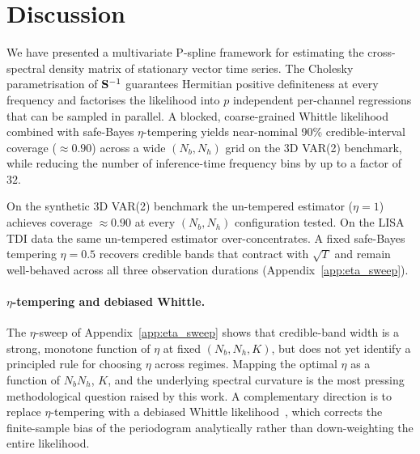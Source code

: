 \documentclass[%
	reprint,
	nofootinbib,
	amsmath,
	amssymb,
	aps,
]{revtex4-2}
\renewcommand{\S}{{\bf S}}
\begin{document}
	\section{Discussion}
	\label{sec:discussion}

	We have presented a multivariate P-spline framework for estimating the
	cross-spectral density matrix of stationary vector time series. The
	Cholesky parametrisation of $\S^{-1}$ guarantees Hermitian positive
	definiteness at every frequency and factorises the likelihood into $p$
	independent per-channel regressions that can be sampled in parallel.
	A blocked, coarse-grained Whittle likelihood combined with safe-Bayes
	$\eta$-tempering yields near-nominal 90\% credible-interval coverage
	($\approx 0.90$) across a wide $(N_{b},N_{h})$ grid on the 3D VAR(2)
	benchmark, while reducing the number of inference-time frequency bins by
	up to a factor of $32$.

	On the synthetic 3D VAR(2) benchmark the un-tempered estimator
	($\eta=1$) achieves coverage $\approx\!0.90$ at every $(N_{b},N_{h})$
	configuration tested. On the LISA TDI data the same un-tempered
	estimator over-concentrates. A fixed safe-Bayes tempering $\eta=0.5$
	recovers credible bands that contract with $\sqrt{T}$ and remain
	well-behaved across all three observation durations
	(Appendix~\ref{app:eta_sweep}).

	\paragraph{$\eta$-tempering and debiased Whittle.}
	The $\eta$-sweep of Appendix~\ref{app:eta_sweep} shows that
	credible-band width is a strong, monotone function of $\eta$ at fixed
	$(N_{b},N_{h},K)$, but does not yet identify a principled rule for
	choosing $\eta$ across regimes. Mapping the optimal $\eta$ as a
	function of $N_{b}N_{h}$, $K$, and the underlying spectral curvature
	is the most pressing methodological question raised by this work.
	A complementary direction is to replace $\eta$-tempering with a
	debiased Whittle likelihood~\citep{sykulski2019_debiased}, which
	corrects the finite-sample bias of the periodogram analytically
	rather than down-weighting the entire likelihood.
\end{document}
